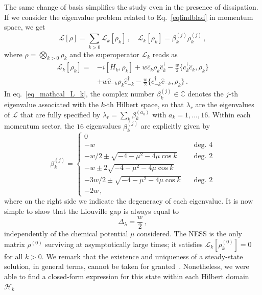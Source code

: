 The same change of basis simplifies the study even in the presence of dissipation. If we consider the eigenvalue problem related to Eq.~\eqref{eqlindblad} in momentum space, we get
\begin{equation}
\mathcal{L}[\rho]=\sum_{k>0}\mathcal{L}_k[\rho_k]\,,\quad \mathcal{L}_k[\rho_{k}]=\beta^{(j)}_{k}\rho^{(j)}_{k}\,,
\label{eq_mathcal_L_k}
\end{equation}
where $\rho=\bigotimes_{k>0}\rho_k$ and the superoperator $\mathcal{L}_k$ reads as
\begin{equation}
\begin{aligned}
        \mathcal{L}_k[\rho_k]=&-i[H_k,\rho_k]+w\hat{c}_{k}\rho_k\hat{c}_{k}^{\dagger}-\frac{w}{2}\{c^\dagger_{k}\hat{c}_{k}, \rho_k\}\\
        &+w\hat{c}_{-k}\rho_k\hat{c}_{-k}^{\dagger}-\frac{w}{2}\{c^\dagger_{-k}\hat{c}_{-k}, \rho_k\}\,.
\end{aligned}
\label{eq_app_def_mathcalL_momentum}
\end{equation}
In eq.~\eqref{eq_mathcal_L_k}, the complex number $\beta^{(j)}_{k}\in\mathbb{C}$ denotes the $j$-th eigenvalue associated with the $k$-th Hilbert space, so that $\lambda_r$ are the eigenvalues of $\mathcal{L}$ that are fully specified by $\lambda_r=\sum_k\beta_k^{(a_k)}$ with $a_k=1,\dots,16$. Within each momentum sector, the $16$ eigenvalues $\beta^{(j)}_k$ are explicitly given by
\begin{equation}
    \beta^{(j)}_k=
    \begin{cases}
        0\\
        -w \quad &\text{deg. 4}\\
        -w/2\pm\sqrt{-4-\mu^2-4\mu\cos{k}}\quad &\text{deg. 2}\\
        -w\pm2\sqrt{-4-\mu^2-4\mu\cos{k}}\\
        -3w/2\pm\sqrt{-4-\mu^2-4\mu\cos{k}}\quad &\text{deg. 2}\\   
        -2w\,,
    \end{cases}
\end{equation}
where on the right side we indicate the degeneracy of each eigenvalue. It is now simple to show that the Liouville gap is always equal to 
\begin{equation}
\Delta_\lambda=\frac{w}{2}\,,
\label{eq_liouville_gap_w_2}
\end{equation}
independently of the chemical potential $\mu$ considered. The NESS is the only matrix $\rho^{(0)}$ surviving at asymptotically large times; it satisfies $\mathcal{L}_k[\rho^{(0)}_k]=0$ for all $k>0$. We remark that the existence and uniqueness of a steady-state solution, in general terms, cannot be taken for granted~\cite{N-2019-uniquenesslindblad}. Nonetheless, we were able to find a closed-form expression for this state within each Hilbert domain $\mathcal{H}_{k}$
